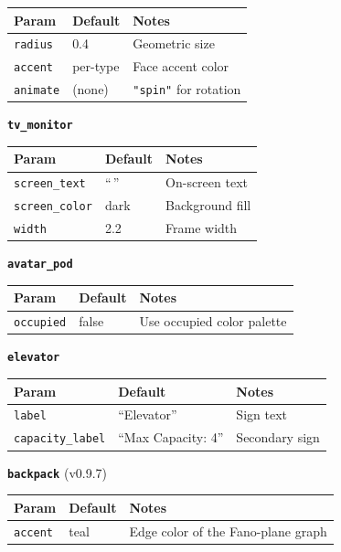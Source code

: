 \documentclass[
  11pt,
]{book}
\begin{document}
\begin{longtable}[]{@{}lll@{}}
\toprule\noalign{}
Param & Default & Notes \\
\midrule\noalign{}
\endhead
\bottomrule\noalign{}
\endlastfoot
\texttt{radius} & 0.4 & Geometric size \\
\texttt{accent} & per-type & Face accent color \\
\texttt{animate} & (none) & \texttt{"spin"} for rotation \\
\end{longtable}

\textbf{\texttt{tv\_monitor}}

\begin{longtable}[]{@{}lll@{}}
\toprule\noalign{}
Param & Default & Notes \\
\midrule\noalign{}
\endhead
\bottomrule\noalign{}
\endlastfoot
\texttt{screen\_text} & ``\,'' & On-screen text \\
\texttt{screen\_color} & dark & Background fill \\
\texttt{width} & 2.2 & Frame width \\
\end{longtable}

\textbf{\texttt{avatar\_pod}}

\begin{longtable}[]{@{}lll@{}}
\toprule\noalign{}
Param & Default & Notes \\
\midrule\noalign{}
\endhead
\bottomrule\noalign{}
\endlastfoot
\texttt{occupied} & false & Use occupied color palette \\
\end{longtable}

\textbf{\texttt{elevator}}

\begin{longtable}[]{@{}lll@{}}
\toprule\noalign{}
Param & Default & Notes \\
\midrule\noalign{}
\endhead
\bottomrule\noalign{}
\endlastfoot
\texttt{label} & ``Elevator'' & Sign text \\
\texttt{capacity\_label} & ``Max Capacity: 4'' & Secondary sign \\
\end{longtable}

\textbf{\texttt{backpack}} (v0.9.7)

\begin{longtable}[]{@{}lll@{}}
\toprule\noalign{}
Param & Default & Notes \\
\midrule\noalign{}
\endhead
\bottomrule\noalign{}
\endlastfoot
\texttt{accent} & teal & Edge color of the Fano-plane graph \\
\end{longtable}
\end{document}

